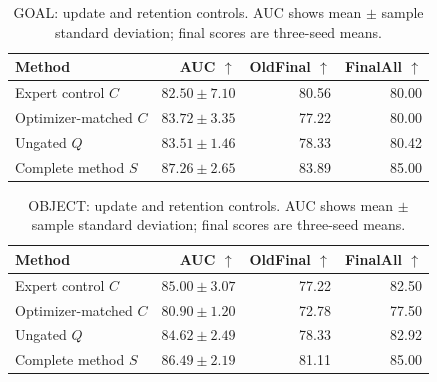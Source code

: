 \begin{table}[tb]
\centering\small
\caption{GOAL: update and retention controls. AUC shows mean $\pm$ sample standard deviation; final scores are three-seed means.}\label{tab:controls-GOAL}
\begin{tabular}{lrrr}
\toprule
Method & AUC $\uparrow$ & OldFinal $\uparrow$ & FinalAll $\uparrow$ \\
\midrule
Expert control $C$ & $82.50\pm7.10$ & 80.56 & 80.00 \\
Optimizer-matched $C$ & $83.72\pm3.35$ & 77.22 & 80.00 \\
Ungated $Q$ & $83.51\pm1.46$ & 78.33 & 80.42 \\
Complete method $S$ & $87.26\pm2.65$ & 83.89 & 85.00 \\
\bottomrule
\end{tabular}
\end{table}

\begin{table}[tb]
\centering\small
\caption{OBJECT: update and retention controls. AUC shows mean $\pm$ sample standard deviation; final scores are three-seed means.}\label{tab:controls-OBJECT}
\begin{tabular}{lrrr}
\toprule
Method & AUC $\uparrow$ & OldFinal $\uparrow$ & FinalAll $\uparrow$ \\
\midrule
Expert control $C$ & $85.00\pm3.07$ & 77.22 & 82.50 \\
Optimizer-matched $C$ & $80.90\pm1.20$ & 72.78 & 77.50 \\
Ungated $Q$ & $84.62\pm2.49$ & 78.33 & 82.92 \\
Complete method $S$ & $86.49\pm2.19$ & 81.11 & 85.00 \\
\bottomrule
\end{tabular}
\end{table}
